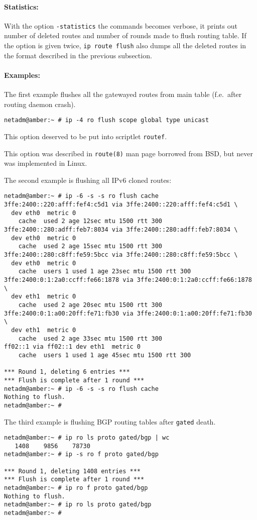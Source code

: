 \paragraph{Statistics:} With the option \verb|-statistics| the commands
becomes verbose, it prints out number of deleted routes and number
of rounds made to flush routing table. If the option is given
twice, \verb|ip route flush| also dumps all the deleted routes
in the format described in the previous subsection.

\paragraph{Examples:} The first example flushes all the
gatewayed routes from main table (f.e.\ after routing daemon crash).
\begin{verbatim}
netadm@amber:~ # ip -4 ro flush scope global type unicast
\end{verbatim}
This option deserved to be put into scriptlet \verb|routef|.
\begin{NB}
This option was described in \verb|route(8)| man page borrowed
from BSD, but never was implemented in Linux.
\end{NB}

The second example is flushing all IPv6 cloned routes:
\begin{verbatim}
netadm@amber:~ # ip -6 -s -s ro flush cache
3ffe:2400::220:afff:fef4:c5d1 via 3ffe:2400::220:afff:fef4:c5d1 \
  dev eth0  metric 0 
    cache  used 2 age 12sec mtu 1500 rtt 300
3ffe:2400::280:adff:feb7:8034 via 3ffe:2400::280:adff:feb7:8034 \
  dev eth0  metric 0 
    cache  used 2 age 15sec mtu 1500 rtt 300
3ffe:2400::280:c8ff:fe59:5bcc via 3ffe:2400::280:c8ff:fe59:5bcc \
  dev eth0  metric 0 
    cache  users 1 used 1 age 23sec mtu 1500 rtt 300
3ffe:2400:0:1:2a0:ccff:fe66:1878 via 3ffe:2400:0:1:2a0:ccff:fe66:1878 \
  dev eth1  metric 0 
    cache  used 2 age 20sec mtu 1500 rtt 300
3ffe:2400:0:1:a00:20ff:fe71:fb30 via 3ffe:2400:0:1:a00:20ff:fe71:fb30 \
  dev eth1  metric 0 
    cache  used 2 age 33sec mtu 1500 rtt 300
ff02::1 via ff02::1 dev eth1  metric 0 
    cache  users 1 used 1 age 45sec mtu 1500 rtt 300

*** Round 1, deleting 6 entries ***
*** Flush is complete after 1 round ***
netadm@amber:~ # ip -6 -s -s ro flush cache
Nothing to flush.
netadm@amber:~ #
\end{verbatim}

The third example is flushing BGP routing tables after \verb|gated|
death.
\begin{verbatim}
netadm@amber:~ # ip ro ls proto gated/bgp | wc
   1408    9856    78730
netadm@amber:~ # ip -s ro f proto gated/bgp

*** Round 1, deleting 1408 entries ***
*** Flush is complete after 1 round ***
netadm@amber:~ # ip ro f proto gated/bgp
Nothing to flush.
netadm@amber:~ # ip ro ls proto gated/bgp
netadm@amber:~ #
\end{verbatim}


